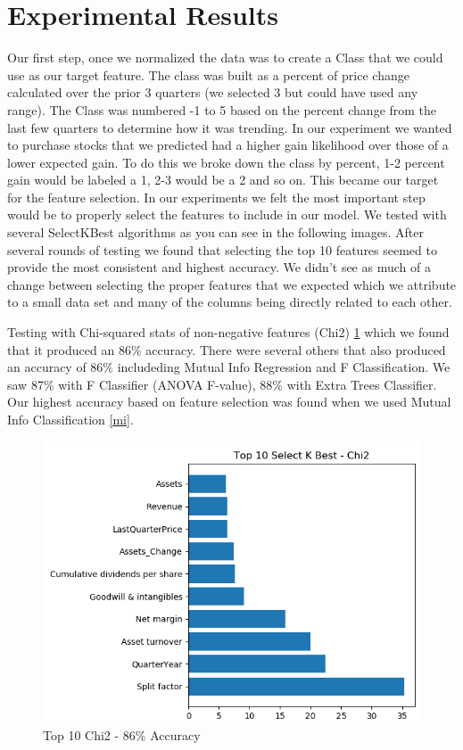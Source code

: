 \documentclass[conference]{IEEEtran}
\begin{document}
\section{Experimental Results}
Our first step, once we normalized the data was to create a Class that we could use as our target feature.  The class was built as a percent of price change calculated over the prior 3 quarters (we selected 3 but could have used any range). The Class was numbered -1 to 5 based on the percent change from the last few quarters to determine how it was trending.  In our experiment we wanted to purchase stocks that we predicted had a higher gain likelihood over those of a lower expected gain.  To do this we broke down the class by percent, 1-2 percent gain would be labeled a 1, 2-3 would be a 2 and so on. This became our target for the feature selection.
In our experiments we felt the most important step would be to properly select the features to include in our model. We tested with several SelectKBest algorithms as you can see in the following images. After several rounds of testing we found that selecting the top 10 features seemed to provide the most consistent and highest accuracy.  We didn't see as much of a change between selecting the proper features that we expected which we attribute to a small data set and many of the columns being directly related to each other.  

Testing with Chi-squared stats of non-negative features (Chi2) \ref{chi2} which we found that it produced an 86\% accuracy.  There were several others that also produced an accuracy of 86\% includeding Mutual Info Regression and F Classification. We saw 87\% with F Classifier (ANOVA F-value), 88\% with Extra Trees Classifier. Our highest accuracy based on feature selection was found when we used Mutual Info Classification \ref{mi}.

\begin{figure}
  \includegraphics[width=\linewidth]{Top10Chi2.png}
  \caption{Top 10 Chi2 - 86\% Accuracy}
  \label{chi2}
\end{figure}
\end{document}
